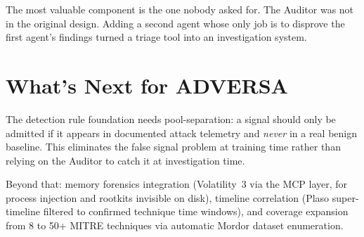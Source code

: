 \documentclass[10pt, letterpaper]{article}
\begin{document}
The most valuable component is the one nobody asked for. The Auditor was
not in the original design. Adding a second agent whose only job is to
disprove the first agent's findings turned a triage tool into an
investigation system.

\section{What's Next for ADVERSA}

The detection rule foundation needs pool-separation: a signal should only
be admitted if it appears in documented attack telemetry and \emph{never}
in a real benign baseline. This eliminates the false signal problem at
training time rather than relying on the Auditor to catch it at
investigation time.

Beyond that: memory forensics integration (Volatility~3 via the MCP
layer, for process injection and rootkits invisible on disk), timeline
correlation (Plaso super-timeline filtered to confirmed technique time
windows), and coverage expansion from 8 to 50+ MITRE techniques via
automatic Mordor dataset enumeration.
\end{document}

